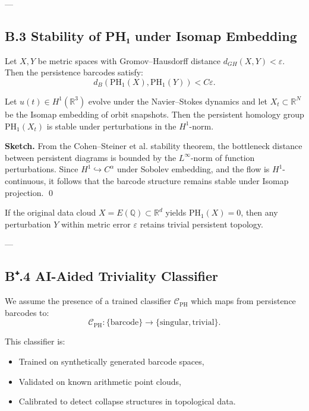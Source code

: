 ---

\subsection*{B.3 Stability of PH₁ under Isomap Embedding}

\begin{theorem}
Let \( X, Y \) be metric spaces with Gromov–Hausdorff distance \( d_{GH}(X, Y) < \varepsilon \).  
Then the persistence barcodes satisfy:
\[
d_B(\mathrm{PH}_1(X), \mathrm{PH}_1(Y)) < C \varepsilon.
\]
\end{theorem}

\begin{lemma}
Let \( u(t) \in H^1(\mathbb{R}^3) \) evolve under the Navier–Stokes dynamics and let \( X_t \subset \mathbb{R}^N \) be the Isomap embedding of orbit snapshots.  
Then the persistent homology group \( \mathrm{PH}_1(X_t) \) is stable under perturbations in the \( H^1 \)-norm.

\textbf{Sketch.}  
From the Cohen–Steiner et al. stability theorem, the bottleneck distance between persistent diagrams is bounded by the \( L^\infty \)-norm of function perturbations.  
Since \( H^1 \hookrightarrow C^\alpha \) under Sobolev embedding, and the flow is \( H^1 \)-continuous, it follows that the barcode structure remains stable under Isomap projection.
\qed
\end{lemma}

\begin{corollary}
If the original data cloud \( X = E(\mathbb{Q}) \subset \mathbb{R}^d \) yields \( \mathrm{PH}_1(X) = 0 \),  
then any perturbation \( Y \) within metric error \( \varepsilon \) retains trivial persistent topology.
\end{corollary}


---

\subsection*{B⁺.4 AI-Aided Triviality Classifier}

We assume the presence of a trained classifier \( \mathcal{C}_{\mathrm{PH}} \) which maps from persistence barcodes to:
\[
\mathcal{C}_{\mathrm{PH}}: \{\text{barcode}\} \to \{\text{singular}, \text{trivial}\}.
\]

This classifier is:
\begin{itemize}
  \item Trained on synthetically generated barcode spaces,
  \item Validated on known arithmetic point clouds,
  \item Calibrated to detect collapse structures in topological data.
\end{itemize}

